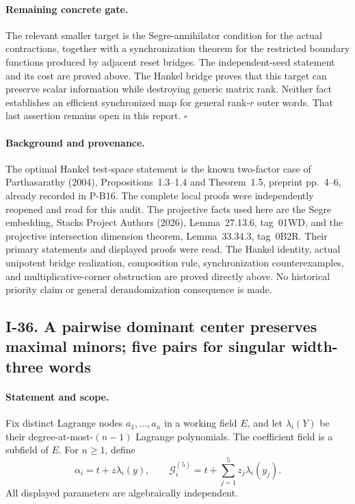 \paragraph{Remaining concrete gate.}
The relevant smaller target is the Segre-annihilator condition for
the actual contractions, together with a synchronization theorem
for the restricted boundary functions produced by adjacent reset
bridges. The independent-seed statement and its cost are proved
above. The Hankel bridge proves that this target can preserve scalar
information while destroying generic matrix rank. Neither fact
establishes an efficient synchronized map for general rank-$r$
outer words. That last assertion remains open in this report.
\hfill$\square$

\paragraph{Background and provenance.}
The optimal Hankel test-space statement is the known two-factor
case of Parthasarathy (2004), Propositions~1.3--1.4 and Theorem~1.5,
preprint pp.~4--6, already recorded in P-B16. The complete local
proofs were independently reopened and read for this audit.
The projective facts used here are the Segre embedding, Stacks
Project Authors (2026), Lemma~27.13.6, tag~01WD, and the projective
intersection dimension theorem, Lemma~33.34.3, tag~0B2R. Their
primary statements and displayed proofs were read. The Hankel
identity, actual unipotent bridge realization, composition rule,
synchronization counterexamples, and multiplicative-corner
obstruction are proved directly above. No historical priority
claim or general derandomization consequence is made.

\subsection{I-36. A pairwise dominant center preserves maximal minors; five pairs for singular width-three words}
\label{I-36}

\paragraph{Statement and scope.}
Fix distinct Lagrange nodes $a_1,\ldots,a_n$ in a working field
$E$, and let $\lambda_i(Y)$ be their degree-at-most-$(n-1)$
Lagrange polynomials. The coefficient field is a subfield of $E$.
For $n\ge1$, define
\[
 \alpha_i=t+z\lambda_i(y),\qquad
 \mathcal G_i^{(5)}=t+\sum_{j=1}^{5}z_j\lambda_i(y_j).
 \tag{I.84}
\]
All displayed parameters are algebraically independent.

